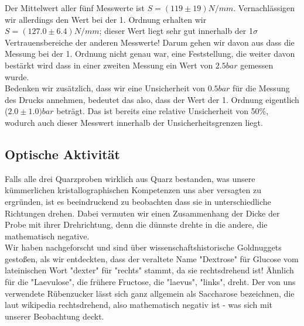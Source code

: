 \documentclass[twoside]{article}
\begin{document}
Der Mittelwert aller fünf Messwerte ist $S=(119 \pm 19)\si{N/mm}$. Vernachlässigen wir allerdings den Wert bei der 1. Ordnung erhalten wir $S=(127.0 \pm 6.4)\si{N/mm}$; dieser Wert liegt sehr gut innerhalb der 1$\sigma$ Vertrauensbereiche der anderen Messwerte! Darum gehen wir davon aus dass die Messung bei der 1. Ordnung nicht genau war, eine Feststellung, die weiter davon bestärkt wird dass in einer zweiten Messung ein Wert von $2.5 \si{bar}$ gemessen wurde.\\
Bedenken wir zusätzlich, dass wir eine Unsicherheit von $0.5 \si{bar}$ für die Messung des Drucks annehmen, bedeutet das also, dass der Wert der 1. Ordnung eigentlich ($2.0 \pm 1.0)\si{bar}$ beträgt. Das ist bereits eine relative Unsicherheit von 50\%, wodurch auch dieser Messwert innerhalb der Unsicherheitsgrenzen liegt. 

\subsection{Optische Aktivität}
Falls alle drei Quarzproben wirklich aus Quarz bestanden, was unsere kümmerlichen kristallographischen Kompetenzen uns aber versagten zu ergründen, ist es beeindruckend zu beobachten dass sie in unterschiedliche Richtungen drehen. Dabei vermuten wir einen Zusammenhang der Dicke der Probe mit ihrer Drehrichtung, denn die dünnste drehte in die andere, die mathematisch negative.\\
Wir haben nachgeforscht und sind über wissenschaftshistorische Goldnuggets gestoßen, als wir entdeckten, dass der veraltete Name "Dextrose" für Glucose vom lateinischen Wort "dexter" für "rechts" stammt, da sie rechtsdrehend ist! Ähnlich für die "Laevulose", die frühere Fructose, die "laevus", "links", dreht. Der von uns verwendete Rübenzucker lässt sich ganz allgemein als Saccharose bezeichnen, die laut wikipedia rechtsdrehend, also mathematisch negativ ist - was sich mit unserer Beobachtung deckt. 
\end{document}

